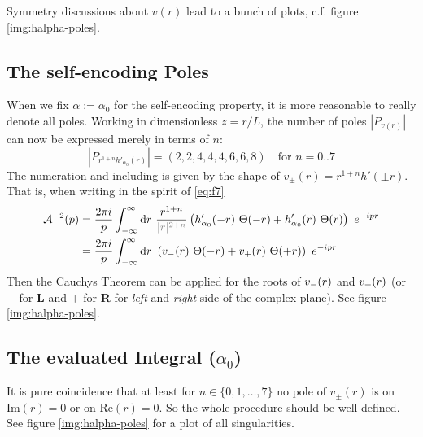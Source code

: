\documentclass[10pt,a4paper, fleqn]{article}
\begin{document}
Symmetry discussions about $v(r)$ lead to a bunch of plots, c.f. figure \ref{img:halpha-poles}.


\subsection{The self-encoding Poles}
When we fix $\alpha:=\alpha_0$ for the self-encoding property, it is more reasonable to really denote all poles. Working in dimensionless $z=r/L$, the number of poles $|P_{v(r)}|$ can now be expressed merely in terms of $n$:
%
\begin{equation}
|P_{r^{1+n} h'_{\alpha_0}(r)}| = (2,2,4,4,4,6,6,8) \quad \text{for } n=0..7
\end{equation}
%
The numeration and including is given by the shape of $v_\pm(r) = r^{1+n} h'(\pm r)$. That is, when writing in the spirit of \eqref{eq:f7}
%
\begin{align}
\C A^{-2}(p) &= \frac{2\pi i}p \int_{-\infty}^\infty \d r~ 
\frac{ r^{1+n} }{\mathcolor{gray}{|r|^{2+n}}}
\left( h'_{\alpha_0}(-r)~\Theta(-r) + 
h'_{\alpha_0}(r)~\Theta(r) \right) ~e^{-ipr} \\
&= \frac{2\pi i}p \int_{-\infty}^\infty \d r~ \left( v_{\bf -}(r)~\Theta(-r) + v_{\bf +}(r)~\Theta(+r) \right)~e^{-ipr}
\end{align}
%
Then the Cauchys Theorem can be applied for the roots of $v_{\bf -}(r)$ and $v_{\bf +}(r)$ (or $-$ for {\bf L} and $+$ for {\bf R} for {\it left} and {\it right} side of the complex plane). See figure \ref{img:halpha-poles}.

\vspace{2cm}
\subsection{The evaluated Integral ($\alpha_0$)}
It is pure coincidence that at least for $n \in \{0,1,\dots,7\}$ no pole of $v_\pm(r)$ is on $\text{Im}(r)=0$ or on $\text{Re}(r)=0$. So the whole procedure should be well-defined. See figure \ref{img:halpha-poles} for a plot of all singularities.
\end{document}

